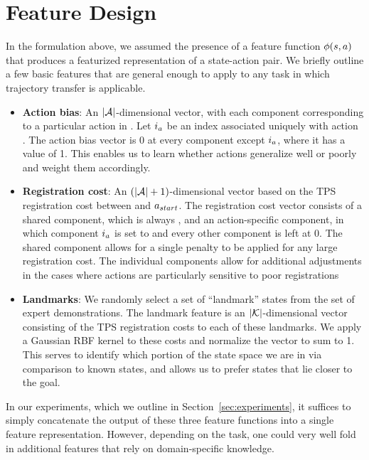 \section{Feature Design}
\label{sec:features}

In the formulation above, we assumed the presence of a feature function
$\phi(s, a)$ that produces a featurized representation of
a state-action pair.  We briefly outline a few basic features that are general
enough to apply to any task in which trajectory transfer is
applicable.

\begin{itemize}
  \item \textbf{Action bias}: An $|\mathcal{A}{}|$-dimensional vector, with each
    component corresponding to a particular action in \actionset{}. Let
    $i{}_{a{}}$ be an index associated uniquely with action
    \actionvar{}. The action bias vector is 0 at every component except
    $i{}_{a{}}$, where it has a value of 1. This enables us to
    learn whether actions generalize well or poorly and weight them accordingly.
  \item \textbf{Registration cost}: An $(|\mathcal{A}{}|+1)$-dimensional vector
    based on the TPS registration cost \regcost{} between \statevar{} and
    $a{}_{start}$. The registration cost vector consists of a shared
    component, which is always \regcost{}, and an action-specific component, in
    which component $i{}_{a{}}$ is set to \regcost{} and every
    other component is left at 0. The shared component allows for a single
    penalty to be applied for any large registration cost. The individual
    components allow for additional adjustments in the cases where actions are
    particularly sensitive to poor registrations
  \item \textbf{Landmarks}: We randomly select a set of ``landmark'' states
    \landmarkset{} from the set of expert demonstrations. The landmark feature
    is an $|\mathcal{K}{}|$-dimensional vector consisting of the TPS
    registration costs to each of these landmarks. We apply a Gaussian RBF
    kernel to these costs and normalize the vector to sum to 1. This serves to
    identify which portion of the state space we are in via comparison to known
    states, and allows us to prefer states that lie closer to the goal.
\end{itemize}

In our experiments, which we outline in Section~\ref{sec:experiments}, it
suffices to simply concatenate the output of these three feature functions into
a single feature representation. However, depending on the task, one could
very well fold in additional features that rely on domain-specific knowledge.
